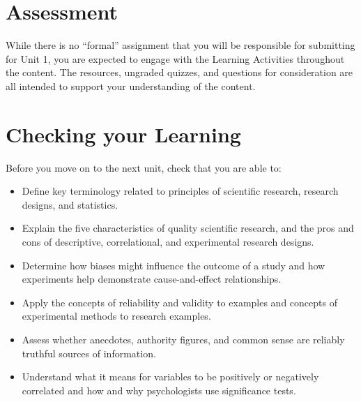 \documentclass[
]{book}
\providecommand{\tightlist}{%
  \setlength{\itemsep}{0pt}\setlength{\parskip}{0pt}}
\begin{document}
\hypertarget{assessment}{%
\section*{Assessment}\label{assessment}}

\begin{assessment}
While there is no ``formal'' assignment that you will be responsible for submitting for Unit 1, you are expected to engage with the Learning Activities throughout the content. The resources, ungraded quizzes, and questions for consideration are all intended to support your understanding of the content.
\end{assessment}

\hypertarget{checking-your-learning}{%
\section*{Checking your Learning}\label{checking-your-learning}}

\begin{progress}
Before you move on to the next unit, check that you are able to:

\begin{itemize}
\tightlist
\item
  Define key terminology related to principles of scientific research, research designs, and statistics.\\
\item
  Explain the five characteristics of quality scientific research, and the pros and cons of descriptive, correlational, and experimental research designs.\\
\item
  Determine how biases might influence the outcome of a study and how experiments help demonstrate cause-and-effect relationships.\\
\item
  Apply the concepts of reliability and validity to examples and concepts of experimental methods to research examples.\\
\item
  Assess whether anecdotes, authority figures, and common sense are reliably truthful sources of information.\\
\item
  Understand what it means for variables to be positively or negatively correlated and how and why psychologists use significance tests.
\end{itemize}
\end{progress}
\end{document}
